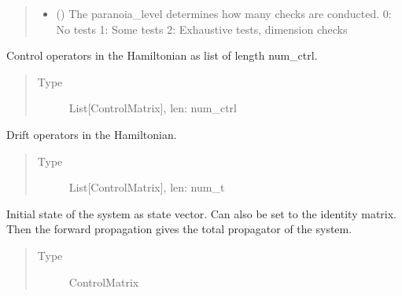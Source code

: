 \documentclass[letterpaper,10pt,english]{sphinxmanual}
\begin{document}
\begin{fulllineitems}
\begin{quote}
\begin{description}
\begin{itemize}
\item {} 
 () \textendash{} The paranoia\_level determines how many checks are conducted.
0: No tests
1: Some tests
2: Exhaustive tests, dimension checks

\end{itemize}

\end{description}\end{quote}

\begin{fulllineitems}
\label{\detokenize{qsim:qsim.solver_algorithms.Solver.h_ctrl}}
Control operators in the Hamiltonian as list of length num\_ctrl.
\begin{quote}\begin{description}
\item[{Type}] \leavevmode
List{[}ControlMatrix{]}, len: num\_ctrl

\end{description}\end{quote}

\end{fulllineitems}


\begin{fulllineitems}
\label{\detokenize{qsim:qsim.solver_algorithms.Solver.h_drift}}
Drift operators in the Hamiltonian.
\begin{quote}\begin{description}
\item[{Type}] \leavevmode
List{[}ControlMatrix{]}, len: num\_t

\end{description}\end{quote}

\end{fulllineitems}


\begin{fulllineitems}
\label{\detokenize{qsim:qsim.solver_algorithms.Solver.initial_state}}
Initial state of the system as state vector. Can also be set to the
identity matrix. Then the forward propagation gives the total
propagator of the system.
\begin{quote}\begin{description}
\item[{Type}] \leavevmode
ControlMatrix


\end{description}
\end{quote}
\end{fulllineitems}
\end{fulllineitems}
\end{document}
